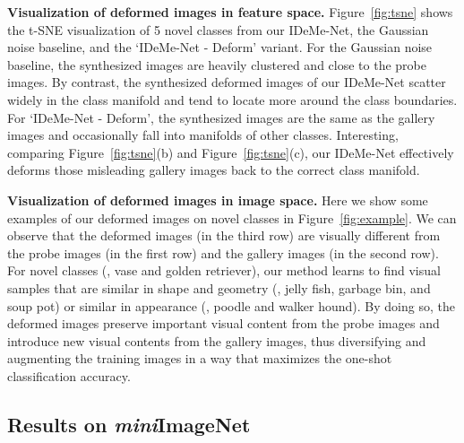 \documentclass[10pt,letterpaper,twocolumn]{article}
\begin{document}
\noindent \textbf{Visualization of deformed images in feature space.} Figure~\ref{fig:tsne} shows the t-SNE
\cite{tsne} visualization of 5 novel classes from our IDeMe-Net,
the Gaussian noise baseline, and the `IDeMe-Net - Deform' variant. For the Gaussian noise
baseline, the synthesized images are heavily clustered and
close to the probe images. By contrast, the synthesized deformed images
of our IDeMe-Net scatter widely in the class manifold and tend to
locate more around the class boundaries. For `IDeMe-Net - Deform',
the synthesized images are the same as the gallery images
and occasionally fall into manifolds of other classes. Interesting,
comparing Figure~\ref{fig:tsne}(b) and Figure~\ref{fig:tsne}(c), our
IDeMe-Net effectively deforms those misleading gallery images back
to the correct class manifold.

\noindent \textbf{Visualization of deformed images in image space.} Here we show some examples of
our deformed images on novel classes in Figure~\ref{fig:example}. We can observe that the deformed images (in the third row) are visually different from the probe images (in the first row) and the gallery images (in the second row). For novel classes (\eg, vase and golden retriever), our method learns to find visual samples that are similar in shape and geometry (\eg, jelly fish, garbage bin, and soup pot) or similar in appearance (\eg, poodle and walker hound). By doing so, the deformed images preserve important visual content from the probe images and introduce new visual contents from the gallery images, thus diversifying and augmenting the training images in a way that maximizes the one-shot classification accuracy.






\subsection{Results on \emph{mini}ImageNet}
\end{document}
